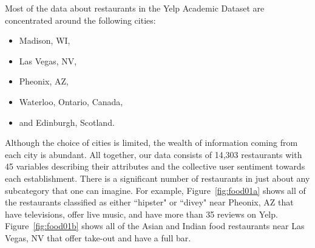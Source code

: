 \documentclass[11pt]{article}
\begin{document}
Most of the data about restaurants in the Yelp Academic Dataset are concentrated around the following cities:
\begin{itemize}
	\item Madison, WI, 
	\item Las Vegas, NV,
	\item Pheonix, AZ,
	\item Waterloo, Ontario, Canada,
	\item and Edinburgh, Scotland.
\end{itemize}
Although the choice of cities is limited, the wealth of information coming from each city is abundant. All together, our data consists of 14,303 restaurants with 45 variables describing their attributes and the collective user sentiment towards each establishment. There is a significant number of restaurants in just about any subcategory that one can imagine. For example, Figure~\ref{fig:food01a} shows all of the restaurants classified as either ``hipster" or ``divey" near Pheonix, AZ that have televisions, offer live music, and have more than 35 reviews on Yelp. Figure~\ref{fig:food01b} shows all of the Asian and Indian food restaurants near Las Vegas, NV that offer take-out and have a full bar.
\end{document}
